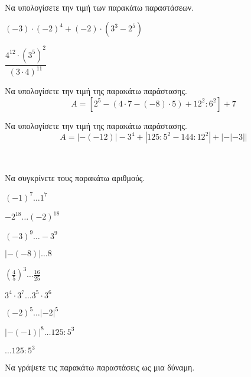\documentclass[ektypwsh]{diag-xelatex}
\begin{document}
\newpage
\noindent
\askhseis
\begin{thema}
\item \mbox{}\\\vspace{-7mm}
\begin{erwthma}
\item Να υπολογίσετε την τιμή των παρακάτω παραστάσεων.
\begin{multicols}{2}
\begin{rlist}
\item $ (-3)\cdot(-2)^4+(-2)\cdot\left( 3^3-2^5\right)  $
\item $ \dfrac{4^{12}\cdot \left( 3^5\right)^2}{(3\cdot 4)^{11}} $
\end{rlist}
\end{multicols}
\item Να υπολογίσετε την τιμή της παρακάτω παράστασης.
\[ A=\left[ 2^5-(4\cdot 7-(-8)\cdot5)+12^2:6^2\right] +7 \]
\item Να υπολογίσετε την τιμή της παρακάτω παράστασης.
\[ A=|-(-12)|-3^4+\left|125:5^2-144:12^2\right| +\left| -|-3|\right|  \]
\end{erwthma}
\item \mbox{}\\\vspace{-7mm}
\begin{erwthma}
\item Να συγκρίνετε τους παρακάτω αριθμούς.
\begin{multicols}{3}
\begin{rlist}
\item $ (-1)^7\ldots1^7 $
\item $ -2^{18}\ldots(-2)^{18} $
\item $ (-3)^9\ldots -3^9 $
\item $ |-(-8)|\ldots 8 $
\item $ \left( \frac{4}{5}\right)^3 \ldots\frac{16}{25} $
\item $ 3^4\cdot 3^7\ldots 3^5\cdot 3^6 $
\item $ (-2)^5\ldots |-2|^5 $
\item $ |-(-1)|^8\ldots 125:5^3 $
\item $ \ldots 125:5^3 $
\end{rlist}
\end{multicols}
\item Να γράψετε τις παρακάτω παραστάσεις ως μια δύναμη.
\begin{multicols}{4}
\begin{rlist}

\end{rlist}
\end{multicols}
\end{erwthma}
\end{thema}
\end{document}
